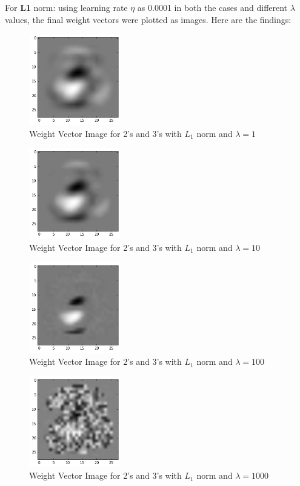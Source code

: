 \documentclass{article}
\begin{document}
For \textbf{L1} norm: using learning rate $\eta$ as 0.0001 in both the cases and different $\lambda$ values, the final weight vectors were plotted as images. Here are the findings:
\newpage
\begin{figure}[h!]
  \centering
  \includegraphics[width=40mm, scale=0.5]{graphs/23Weights_l1_1.PNG}
  \caption{Weight Vector Image for 2's and 3's with $L_{1}$ norm and $\lambda = 1$}
  \label{fig15}
\end{figure} 

\begin{figure}[h!]
    \centering
  \includegraphics[width=40mm, scale=0.5]{graphs/23Weights_l1_10.PNG}
  \caption{Weight Vector Image for 2's and 3's with $L_{1}$ norm and $\lambda = 10$}
  \label{fig16}
\end{figure}

\begin{figure}[h!]
    \centering
  \includegraphics[width=40mm, scale=0.5]{graphs/23Weights_l1_100.PNG}
  \caption{Weight Vector Image for 2's and 3's with $L_{1}$ norm and $\lambda = 100$}
  \label{fig17}
\end{figure}

\begin{figure}[h!]
    \centering
  \includegraphics[width=40mm, scale=0.5]{graphs/23Weights_l1_1000.PNG}
  \caption{Weight Vector Image for 2's and 3's with $L_{1}$ norm and $\lambda = 1000$}
  \label{fig18}
\end{figure}
\end{document}
